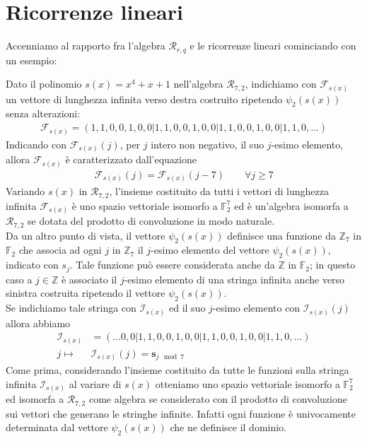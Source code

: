 \section{Ricorrenze lineari}

Accenniamo al rapporto fra l'algebra $\mathcal{R}_{r,q}$ e le ricorrenze lineari cominciando con un esempio:
\begin{esempio}\label{ese:ricorr1}
   Dato il polinomio $s(x) = x^4 + x+ 1$ nell'algebra $\mathcal{R}_{7,2}$, indichiamo con $\mathscr{F}_{s(x)}$ un vettore di lunghezza infinita verso destra costruito ripetendo $\psi_{2}(s(x))$ senza alterazioni:
   \begin{align*}
      \mathscr{F}_{s(x)} = (1,1,0,0,1,0,0 | 1,1,0,0,1,0,0  | 1,1,0,0,1,0,0 | 1,1,0, \dots )
   \end{align*}
   Indicando con $\mathscr{F}_{s(x)}(j)$, per $j$ intero non negativo, il suo $j$-esimo elemento, allora $\mathscr{F}_{s(x)}$ è caratterizzato dall'equazione
   \begin{align*}
      \mathscr{F}_{s(x)} (j) = \mathscr{F}_{s(x)} (j-7) \qquad \forall j \geq 7 
   \end{align*}
   Variando $s(x)$ in $\mathcal{R}_{7,2}$, l'insieme costituito da tutti i vettori di lunghezza infinita $\mathscr{F}_{s(x)}$ è uno spazio vettoriale isomorfo a $\mathbb{F}_{2}^{7}$ ed è un'algebra isomorfa a $\mathcal{R}_{7,2}$ se dotata del prodotto di convoluzione in modo naturale.\\
   Da un altro punto di vista, il vettore $\psi_{2}(s(x))$ definisce una funzione da $\mathbb{Z}_{7}$ in $\mathbb{F}_{2}$ che associa ad ogni $j$ in $\mathbb{Z}_{7}$ il $j$-esimo elemento del vettore $\psi_{2}(s(x))$, indicato con $s_j$. Tale funzione può essere considerata anche da $\mathbb{Z}$ in $\mathbb{F}_{2}$; in questo caso a $j \in \mathbb{Z}$ è associato il $j$-esimo elemento di una stringa infinita anche verso sinistra costruita ripetendo il vettore $\psi_{2}(s(x))$.\\
   Se indichiamo tale stringa con $\mathscr{I}_{s(x)}$ ed il suo $j$-esimo elemento con $\mathscr{I}_{s(x)}(j)$ allora abbiamo
   \begin{align*}
      \mathscr{I}_{s(x)} &= ( \dots 0,0 | 1,1,0,0,1,0,0  | 1,1,0,0,1,0,0 | 1,1,0, \dots ) \\
      j \longmapsto & \mathscr{I}_{s(x)}(j) = \mathbf{s}_{j \mod{7}}
   \end{align*}
   Come prima, considerando l'insieme costituito da tutte le funzioni sulla stringa infinita $\mathscr{I}_{s(x)}$ al variare di $s(x)$ otteniamo uno spazio vettoriale isomorfo a $\mathbb{F}_{2}^{7}$ ed isomorfa a $\mathcal{R}_{7,2}$ come algebra se considerato con il prodotto di convoluzione sui vettori che generano le stringhe infinite. Infatti ogni funzione è univocamente determinata dal vettore $\psi_{2}(s(x))$ che ne definisce il dominio. \\
\end{esempio}
